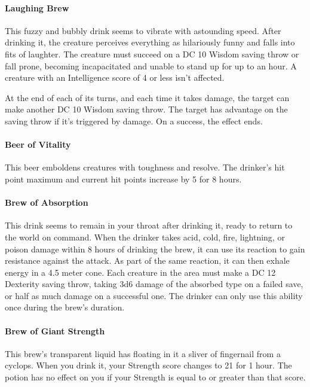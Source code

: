 \paragraph{Laughing Brew} %
    This fuzzy and bubbly drink seems to vibrate with astounding speed.
    After drinking it, the creature perceives everything as hilariously funny and falls into fits of laughter.
    The creature must succeed on a DC 10 Wisdom saving throw or fall prone, becoming incapacitated and unable to stand up for up to an hour.
    A creature with an Intelligence score of 4 or less isn't affected.

    At the end of each of its turns, and each time it takes damage, the target can make another DC 10 Wisdom saving throw.
    The target has advantage on the saving throw if it's triggered by damage.
    On a success, the effect ends.
\paragraph{Beer of Vitality} %
    This beer emboldens creatures with toughness and resolve.
    The drinker's hit point maximum and current hit points increase by 5 for 8 hours.
\paragraph{Brew of Absorption} %
    This drink seems to remain in your throat after drinking it, ready to return to the world on command.
    When the drinker takes acid, cold, fire, lightning, or poison damage within 8 hours of drinking the brew, it can use its reaction to gain resistance against the attack.
    As part of the same reaction, it can then exhale energy in a 4.5 meter cone.
    Each creature in the area must make a DC 12 Dexterity saving throw, taking 3d6 damage of the absorbed type on a failed save, or half as much damage on a successful one.
    The drinker can only use this ability once during the brew's duration.
\paragraph{Brew of Giant Strength}
    This brew's transparent liquid has floating in it a sliver of fingernail from a cyclops.
    When you drink it, your Strength score changes to 21 for 1 hour.
    The potion has no effect on you if your Strength is equal to or greater than that score.
